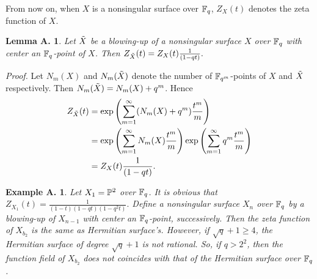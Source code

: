 \documentclass[a4paper,11pt]{article}
\newtheorem{alemma}[atheorem]{Lemma A.\!\!}
\newtheorem{aexample}[atheorem]{Example A.\!\!}
\newcommand{\proof}{\noindent \mbox{\em Proof.\hspace*{2mm}}}
\begin{document}
From now on, when $X$ is a nonsingular surface over ${\Bbb F}_q$,
$Z_X(t)$ denotes the zeta function of $X$.

\begin{alemma}
Let $\Tilde{X}$ be a blowing-up of a nonsingular surface $X$ over ${\Bbb F}_q$
with center an  ${\Bbb F}_q$-point of $X$.
Then
$
Z_{\Tilde{X}}(t) = Z_X(t) \frac{1}{(1-qt)}.
$
\end{alemma}
\proof
Let $N_m(X)$ and $N_m(\Tilde{X})$ denote
the number of ${\Bbb F}_{q^m}$-points of
$X$ and $\Tilde{X}$ respectively.
Then
$N_m(\Tilde{X})= N_m(X) +q^m$.
Hence
\begin{align*}
Z_{\Tilde{X}}(t) &= \exp \left(
                     \sum_{m=1}^{\infty} (N_m(X) + q^m)\frac{t^m}{m}
                         \right)\\
                 &= \exp \left(\sum_{m=1}^{\infty}N_m(X)\frac{t^m}{m}\right) 
                      \exp\left(\sum_{m=1}^{\infty} q^m \frac{t^m}{m} \right)\\
                 &= Z_X(t) \frac{1}{(1-qt)}.
\end{align*}

\begin{aexample}
Let $X_1 = {\Bbb P}^2$ over ${\Bbb F}_q$.
It is obvious that
$
Z_{X_1}(t) = \frac{1}{(1-t)(1-qt)(1-q^2t)}.
$
Define a nonsingular surface $X_n$ over ${\Bbb F}_q$
by a blowing-up of $X_{n-1}$
with center an ${\Bbb F}_{q}$-point, successively.
Then the zeta function of $X_{b_2}$ is the same as Hermitian surface's.
However, if $\sqrt{q}+1 \geq 4$,
the Hermitian surface of degree $\sqrt{q}+1$ is not rational.
So, if $q>2^2$, then the function field of $X_{b_2}$
does not coincides with
that of the Hermitian surface over ${\Bbb F}_q$.
\end{aexample}
\end{document}
